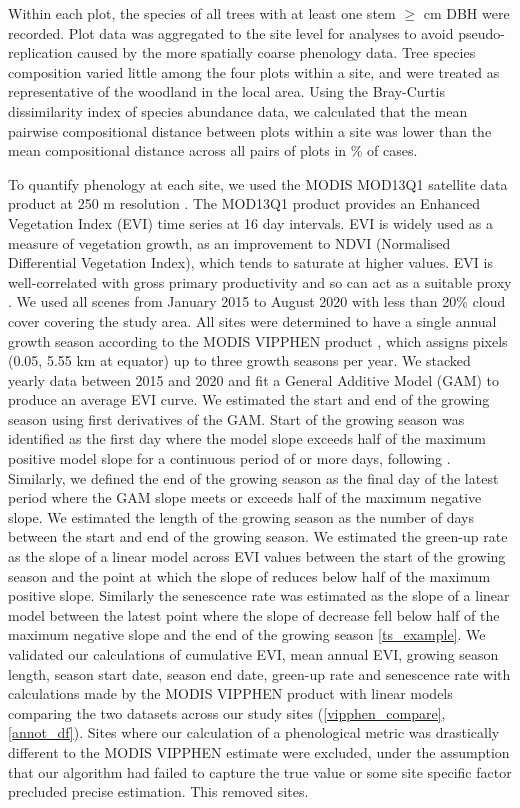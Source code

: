 \documentclass[11pt,a4paper]{article}
\begin{document}
Within each plot, the species of all trees with at least one stem $\geq$\stemSize{} cm DBH were recorded. Plot data was aggregated to the site level for analyses to avoid pseudo-replication caused by the more spatially coarse phenology data. Tree species composition varied little among the four plots within a site, and were treated as representative of the woodland in the local area. Using the Bray-Curtis dissimilarity index of species abundance data, we calculated that the mean pairwise compositional distance between plots within a site was lower than the mean compositional distance across all pairs of plots in \plotDistPer{}\% of cases. 

To quantify phenology at each site, we used the MODIS MOD13Q1 satellite data product at 250 m resolution \citep{MOD13Q1}. The MOD13Q1 product provides an Enhanced Vegetation Index (EVI) time series at 16 day intervals. EVI is widely used as a measure of vegetation growth, as an improvement to NDVI (Normalised Differential Vegetation Index), which tends to saturate at higher values. EVI is well-correlated with gross primary productivity and so can act as a suitable proxy \citep{}. We used all scenes from January 2015 to August 2020 with less than 20\% cloud cover covering the study area. All sites were determined to have a single annual growth season according to the MODIS VIPPHEN product \citep{}, which assigns pixels (0.05\textdegree, 5.55 km at equator) up to three growth seasons per year. We stacked yearly data between 2015 and 2020 and fit a General Additive Model (GAM) to produce an average EVI curve. We estimated the start and end of the growing season using first derivatives of the GAM. Start of the growing season was identified as the first day where the model slope exceeds half of the maximum positive model slope for a continuous period of \modisWin{} or more days, following \citet{White2009}. Similarly, we defined the end of the growing season as the final day of the latest \trmmWin{} period where the GAM slope meets or exceeds half of the maximum negative slope. We estimated the length of the growing season as the number of days between the start and end of the growing season. We estimated the green-up rate as the slope of a linear model across EVI values between the start of the growing season and the point at which the slope of reduces below half of the maximum positive slope. Similarly the senescence rate was estimated as the slope of a linear model between the latest point where the slope of decrease fell below half of the maximum negative slope and the end of the growing season \autoref{ts_example}. We validated our calculations of cumulative EVI, mean annual EVI, growing season length, season start date, season end date, green-up rate and senescence rate with calculations made by the MODIS VIPPHEN product with linear models comparing the two datasets across our study sites (\autoref{vipphen_compare}, \autoref{annot_df}). Sites where our calculation of a phenological metric was drastically different to the MODIS VIPPHEN estimate were excluded, under the assumption that our algorithm had failed to capture the true value or some site specific factor precluded precise estimation. This removed \vipphenOutlier{} sites.
\end{document}
